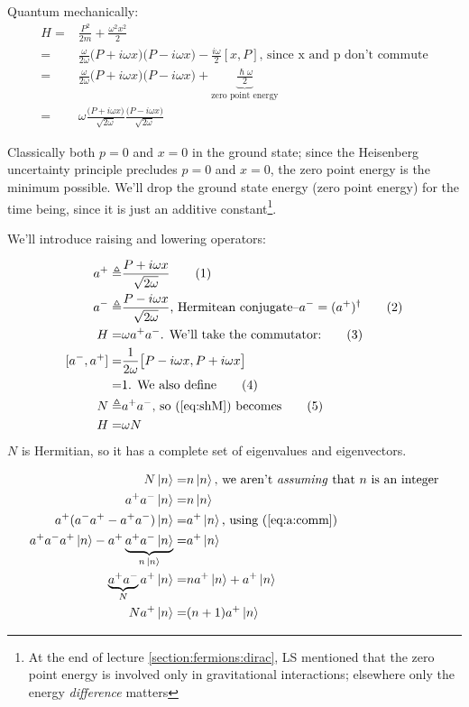 \documentclass[]{article}
\newcommand\numberthis{\addtocounter{equation}{1}\tag{\theequation}}
\begin{document}
Quantum mechanically:
\begin{align*}
	H =& \frac{P^2}{2m} + \frac{\omega^2 x^2}{2}\\
	=& \frac{\omega}{2 \omega}\big(P + i \omega x \big)\big(P - i \omega x \big) - \frac{i \omega}{2} [x,P] \text{, since x and p don't commute}\\
	=& \frac{\omega}{2 \omega}\big(P + i \omega x \big)\big(P - i \omega x \big) + \underbrace{\frac{\hslash \omega}{2}}_\text{zero point energy}\\
	=&\omega \frac{\big(P + i \omega x \big)}{\sqrt{2 \omega}}\frac{\big(P - i \omega x \big)}{\sqrt{2 \omega}}
\end{align*}

Classically both $p=0$ and $x=0$ in the ground state; since the Heisenberg uncertainty principle precludes  $p=0$ and $x=0$, the zero point energy is the minimum possible. We'll drop the ground state energy (zero point energy) for the time being, since it is just an additive constant\footnote{At the end of lecture \ref{section:fermions:dirac}, LS mentioned that the zero point energy is involved only in gravitational interactions; elsewhere only the energy \emph{difference} matters}.

We'll introduce raising and lowering operators:

\begin{align*}
	a^+ \triangleq & \frac{P + i \omega x } {\sqrt{2 \omega}} \numberthis \label{eq:creation:operator}\\
	a^- \triangleq & \frac{P - i \omega x } {\sqrt{2 \omega}}\text{, Hermitean conjugate--$a^-=(a^+)^\dagger$} \numberthis \label{eq:annihilation:operator}\\
	H =& \omega a^+ a^-\text{. We'll take the commutator:}\numberthis \label{eq:shM}\\
	[a^-,a^+] =& \frac{1}{2\omega}\big[P - i \omega x,P + i \omega x\big]\\
	=& 1\text{. We also define} \numberthis \label{eq:a:comm}\\
	N \triangleq& a^+a^-\text{, so (\ref{eq:shM}) becomes} \numberthis \label{eq:number:operator}\\
	H =& \omega N
\end{align*}
$N$ is Hermitian, so it has a complete set of eigenvalues and eigenvectors.

\begin{align*}
	N\ket{n} =& n\ket{n} \text{, we aren't \emph{assuming} that $n$ is an integer}\\
	a^+a^-\ket{n} =& n\ket{n}\\
	a^+(a^-a^+ - a^+a^-)\ket{n} =& a^+\ket{n}\text{, using (\ref{eq:a:comm})}\\
	a^+a^-a^+ \ket{n} - a^+\underbrace{a^+a^- \ket{n}}_\text{$ n\ket{n}$} =& a^+\ket{n}\\
	\underbrace{a^+a^-}_\text{$N$}a^+ \ket{n} =& n a^+\ket{n} + a^+\ket{n}\\
	N a^+ \ket{n} =& (n+1) a^+ \ket{n}
\end{align*}
\end{document}
